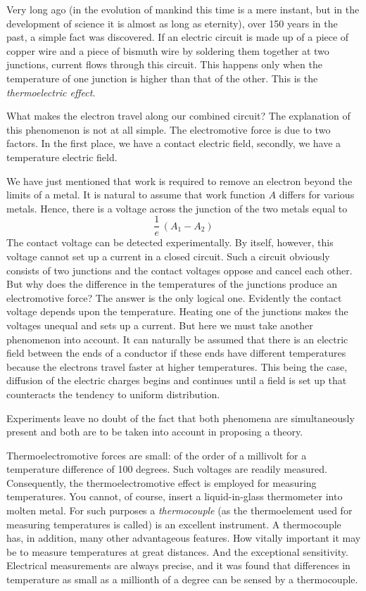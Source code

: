 Very long ago (in the evolution of mankind this time is a mere instant, but in the development of science it is almost as long as eternity), over 150 years in the past, a simple fact was discovered. If an electric circuit is
made up of a piece of copper wire and a piece of bismuth wire by soldering them together at two junctions, current flows through this circuit. This happens only when the temperature of one junction is higher than that of the other. This is the \emph{thermoelectric effect}.

What makes the electron travel along our combined circuit? The explanation of this phenomenon is not at all simple. The electromotive force is due to two factors. In the first place, we have a contact electric field, secondly, we have a temperature electric field.

We have just mentioned that work is required to remove an electron beyond the limits of a metal. It is natural to assume that work function $A$ differs for various metals. Hence, there is a voltage across the junction of the two metals equal to
\begin{equation*}%
\frac{1}{e} \, (A_{1} - A_{2})
\end{equation*}
\label{work-func}
The contact voltage can be detected experimentally. By itself, however, this voltage cannot set up a current in a closed circuit. Such a circuit obviously consists of two junctions and the contact voltages oppose and cancel each other. But why does the difference in the temperatures of the junctions produce an electromotive force? The answer is the only logical one. Evidently the contact voltage depends upon the temperature. Heating one of the junctions makes the voltages unequal and sets up a current. But here we must take another phenomenon into account. It can naturally be assumed that there is an electric field between the ends of a conductor if these ends have different temperatures because the electrons travel faster at higher temperatures. This being the case, diffusion of the electric charges begins and continues until a field is set up that counteracts the tendency to uniform distribution.

Experiments leave no doubt of the fact that both phenomena are simultaneously present and both are to be taken into account in proposing a theory.

Thermoelectromotive forces are small: of the order of a millivolt for a temperature difference of 100 degrees. Such voltages are readily measured. Consequently, the thermoelectromotive effect is employed for measuring temperatures. You cannot, of course, insert a liquid-in-glass thermometer into molten metal. For such purposes a \emph{thermocouple} (as the thermoelement used for measuring temperatures is called) is an excellent instrument. A thermocouple has, in addition, many other advantageous
features. How vitally important it may be to measure temperatures at great distances. And the exceptional sensitivity. Electrical measurements are always precise, and it was found that differences in temperature as small as a millionth of a degree can be sensed by a thermocouple.

